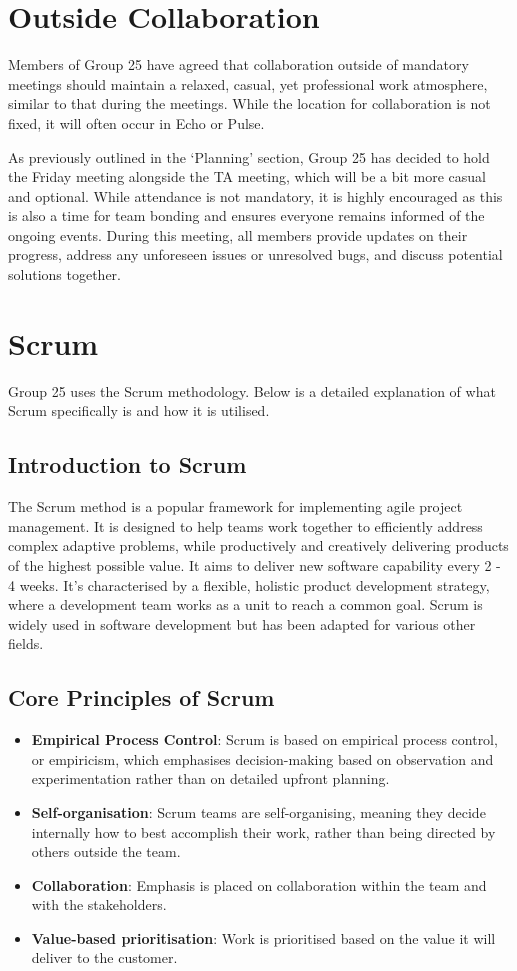 \documentclass[sigconf,nonacm]{acmart}
\begin{document}
\section{Outside Collaboration}
Members of Group 25 have agreed that collaboration outside of mandatory meetings should maintain a relaxed, casual, yet professional work atmosphere, similar to that during the meetings. While the location for collaboration is not fixed, it will often occur in Echo or Pulse.

As previously outlined in the ‘Planning’ section, Group 25 has decided to hold the Friday meeting alongside the TA meeting, which will be a bit more casual and optional. While attendance is not mandatory, it is highly encouraged as this is also a time for team bonding and ensures everyone remains informed of the ongoing events. During this meeting, all members provide updates on their progress, address any unforeseen issues or unresolved bugs, and discuss potential solutions together.


\section{Scrum}
Group 25 uses the Scrum methodology. Below is a detailed explanation of what Scrum specifically is and how it is utilised.

\subsection{Introduction to Scrum}
The Scrum method is a popular framework for implementing agile project management. It is designed to help teams work together to efficiently address complex adaptive problems, while productively and creatively delivering products of the highest possible value. It aims to deliver new software capability every 2 - 4 weeks. It's characterised by a flexible, holistic product development strategy, where a development team works as a unit to reach a common goal. Scrum is widely used in software development but has been adapted for various other fields.

\subsection{Core Principles of Scrum}
\begin{itemize}
    \item \textbf{Empirical Process Control}: Scrum is based on empirical process control, or empiricism, which emphasises decision-making based on observation and experimentation rather than on detailed upfront planning.
    \item \textbf{Self-organisation}: Scrum teams are self-organising, meaning they decide internally how to best accomplish their work, rather than being directed by others outside the team.
    \item \textbf{Collaboration}: Emphasis is placed on collaboration within the team and with the stakeholders.
    \item \textbf{Value-based prioritisation}: Work is prioritised based on the value it will deliver to the customer.
\end{itemize}
\end{document}
